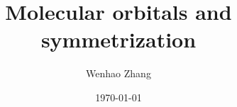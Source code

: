 \documentclass{article}
\begin{document}
\title{Molecular orbitals and symmetrization}
\author{Wenhao Zhang}
\date{\today}
\maketitle




\appendix






\printbibliography[title={Reference}]
\end{document}
